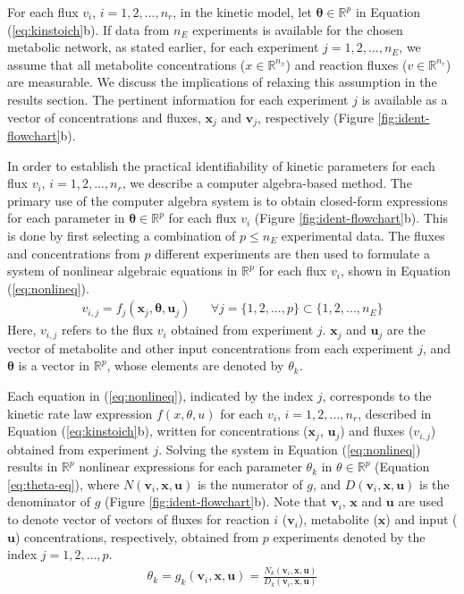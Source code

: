 \documentclass[10pt]{article}
\begin{document}
	For each flux $v_i$, $i={1, 2, ..., n_r}$, in the kinetic model, let $\mathbf{\theta} \in \mathbb{R}^p$ in Equation (\ref{eq:kinstoich}b). If data from $n_E$ experiments is available for the chosen metabolic network, as stated earlier, for each experiment $j = {1, 2, ..., n_E}$, we assume that all metabolite concentrations ($x\in\mathbb{R}^{n_x}$) and reaction fluxes ($v\in\mathbb{R}^{n_r}$) are measurable. We discuss the implications of relaxing this assumption in the results section. The pertinent information for each experiment $j$ is available as a vector of concentrations and fluxes, $\mathbf{x}_j$ and $\mathbf{v}_j$, respectively (Figure \ref{fig:ident-flowchart}b). 
	
	In order to establish the practical identifiability of kinetic parameters for each flux $v_i$, $i={1, 2, ..., n_r}$, we describe a computer algebra-based method. The primary use of the computer algebra system is to obtain closed-form expressions for each parameter in $\mathbf{\theta} \in \mathbb{R}^p$ for each flux $v_i$ (Figure \ref{fig:ident-flowchart}b). This is done by first selecting a combination of $p\le n_E$ experimental data. The fluxes and concentrations from $p$ different experiments are then used to formulate a system of nonlinear algebraic equations in $\mathbb{R}^p$ for each flux $v_i$, shown in Equation (\ref{eq:nonlineq}). 
	\begin{align}\label{eq:nonlineq}
	v_{i, j} = f_j(\mathbf{x}_j,\mathbf{\theta}, \mathbf{u}_j) && \forall j=\{1, 2, ..., p\}\subset\{1, 2, ..., n_E\}
	\end{align}
	Here, $v_{i,j}$ refers to the flux $v_i$ obtained from experiment $j$. $\mathbf{x}_j$ and $\mathbf{u}_j$ are the vector of metabolite and other input concentrations from each experiment $j$, and $\mathbf{\theta}$ is a vector in $\mathbb{R}^p$, whose elements are denoted by $\theta_k$.		
	
	Each equation in (\ref{eq:nonlineq}), indicated by the index $j$, corresponds to the kinetic rate law expression $f(x, \theta, u)$ for each $v_i$, $i={1, 2, ..., n_r}$, described in Equation (\ref{eq:kinstoich}b), written for concentrations ($\mathbf{x}_j$, $\mathbf{u}_j$) and fluxes ($v_{i,j}$) obtained from experiment $j$. Solving the system in Equation (\ref{eq:nonlineq}) results in $\mathbb{R}^p$ nonlinear expressions for each parameter $\theta_k$ in $\theta \in \mathbb{R}^p$ (Equation \ref{eq:theta-eq}), where $N(\mathbf{v}_i, \mathbf{x}, \mathbf{u})$ is the numerator of $g$, and $D(\mathbf{v}_i, \mathbf{x}, \mathbf{u})$ is the denominator of $g$ (Figure \ref{fig:ident-flowchart}b). Note that $\mathbf{v}_i$, $\mathbf{x}$ and $\mathbf{u}$ are used to denote vector of vectors of fluxes for reaction $i$ ($\mathbf{v}_i$), metabolite ($\mathbf{x}$) and input ($\mathbf{u}$) concentrations, respectively, obtained from $p$ experiments denoted by the index $j = {1, 2, ..., p}$.
	\begin{align}\label{eq:theta-eq}
	\theta_k = g_k(\mathbf{v}_i, \mathbf{x}, \mathbf{u}) = \frac{N_k(\mathbf{v}_i, \mathbf{x}, \mathbf{u})}{D_k(\mathbf{v}_i, \mathbf{x}, \mathbf{u})}
	\end{align}
\end{document}
